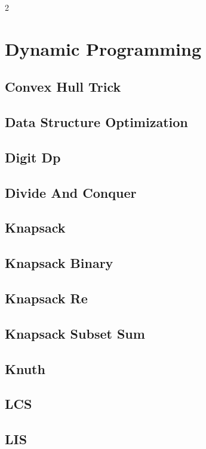 \documentclass[a4paper,landscape,10pt]{article}
\begin{document}
\begin{multicols*}{2}
{\fontsize{15}{18}\selectfont\tableofcontents}
\columnbreak
\section{Dynamic Programming}
\subsection{Convex Hull Trick}

\subsection{Data Structure Optimization}

\subsection{Digit Dp}

\subsection{Divide And Conquer}

\subsection{Knapsack}

\subsection{Knapsack Binary}

\subsection{Knapsack Re}

\subsection{Knapsack Subset Sum}

\subsection{Knuth}

\subsection{LCS}

\subsection{LIS}


\end{multicols*}
\end{document}
